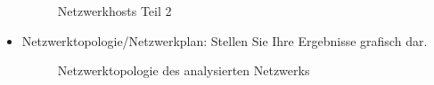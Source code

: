 \documentclass[12pt,a4paper,titlepage,oneside]{scrartcl}
\begin{document}
\begin{itemize}
\newpage
\begin{figure}[h!]
  \centering
  \caption{Netzwerkhosts Teil 2}
  \label{fig:logo12}
\end{figure}
  
\newpage

\item Netzwerktopologie/Netzwerkplan: Stellen Sie Ihre Ergebnisse grafisch dar.
\begin{figure}[h!]
  \centering
  \caption{Netzwerktopologie des analysierten Netzwerks}
  \label{fig:logo10}
\end{figure}

\end{itemize}
\end{document}
